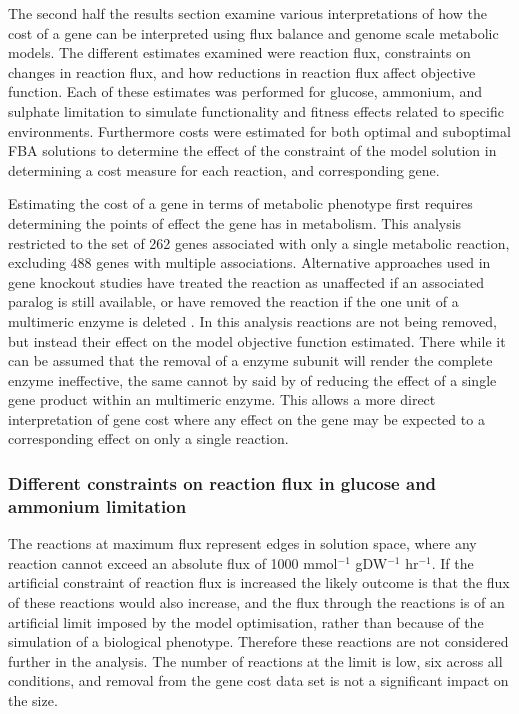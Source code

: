 The second half the results section examine various interpretations of how the cost of a gene can be interpreted using flux balance and genome scale metabolic models. The different estimates examined were reaction flux, constraints on changes in reaction flux, and how reductions in reaction flux affect objective function. Each of these estimates was performed for glucose, ammonium, and sulphate limitation to simulate functionality and fitness effects related to specific environments. Furthermore costs were estimated for both optimal and suboptimal FBA solutions to determine the effect of the constraint of the model solution in determining a cost measure for each reaction, and corresponding gene.

Estimating the cost of a gene in terms of metabolic phenotype first requires determining the points of effect the gene has in metabolism. This analysis restricted to the set of 262 genes associated with only a single metabolic reaction, excluding 488 genes with multiple associations. Alternative approaches used in gene knockout studies have treated the reaction as unaffected if an associated paralog is still available, or have removed the reaction if the one unit of a multimeric enzyme is deleted \cite{pal2006}. In this analysis reactions are not being removed, but instead their effect on the model objective function estimated. There while it can be assumed that the removal of a enzyme subunit will render the complete enzyme ineffective, the same cannot by said by of reducing the effect of a single gene product within an multimeric enzyme. This allows a more direct interpretation of gene cost where any effect on the gene may be expected to a corresponding effect on only a single reaction.

\subsubsection{Different constraints on reaction flux in glucose and ammonium limitation}%

The reactions at maximum flux represent edges in solution space, where any reaction cannot exceed an absolute flux of 1000 mmol$^{-1}$ gDW$^{-1}$ hr$^{-1}$. If the artificial constraint of reaction flux is increased the likely outcome is that the flux of these reactions would also increase, and the flux through the reactions is of an artificial limit imposed by the model optimisation, rather than because of the simulation of a biological phenotype. Therefore these reactions are not considered further in the analysis. The number of reactions at the limit is low, six across all conditions, and removal from the gene cost data set is not a significant impact on the size.

